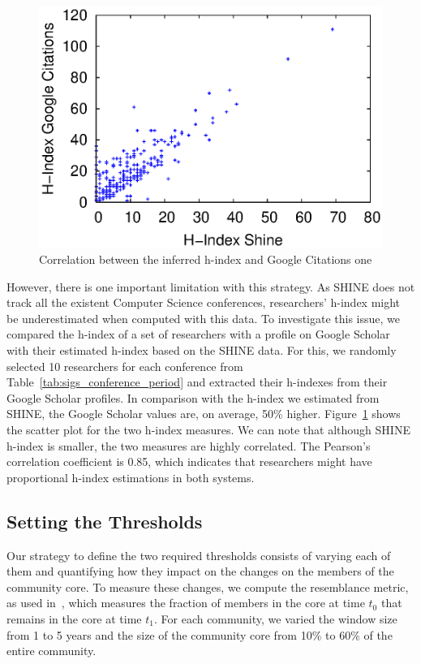 \begin{figure}[!htb]
\centering
\includegraphics[scale=.5]{graficos/hindex/hindex_scatter_plot.eps}
\caption{Correlation between the inferred h-index and Google Citations one}
\vspace{-0.2cm}
\label{fig:hindex_scatter_plot}
\end{figure}


However, there is one important limitation with this strategy.  As SHINE does not track all the existent Computer Science conferences, researchers' h-index might be underestimated when computed
with this data. To investigate this issue, we compared the h-index of a set of researchers with a profile on Google Scholar with their estimated h-index based on the SHINE data. For this, we
randomly selected 10 researchers for each conference from Table~\ref{tab:sigs_conference_period} and extracted their h-indexes from their Google Scholar profiles.  In comparison
with the h-index we estimated from SHINE, the Google Scholar values are, on average, 50\% higher. Figure~\ref{fig:hindex_scatter_plot} shows the scatter plot for the two h-index
measures. We can note that although SHINE h-index is smaller, the two measures are highly correlated. The Pearson's correlation coefficient is 0.85, which indicates that researchers
might have proportional h-index estimations in both systems. 

\subsection{Setting the Thresholds}
\label{sub:thresholds}

Our strategy to define the two required thresholds consists of varying each of them and quantifying how they impact on the changes on the members of the community core. To measure these
changes, we compute the resemblance metric, as used in~\cite{Viswanath:2009}, which measures the fraction of members in the core at time $t_0$ that remains in the core at time $t_1$. 
For each community, we varied the window size from 1 to 5 years and the size of the community core from 10\% to 60\% of the entire community.


